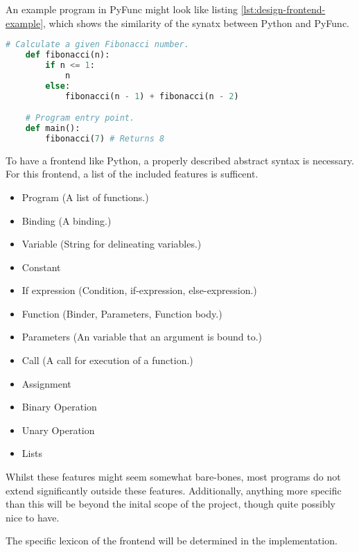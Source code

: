 \documentclass{l4proj}
\begin{document}
An example program in PyFunc might look like listing \ref{lst:design-frontend-example}, which shows the similarity of the synatx between Python and PyFunc.
\begin{lstlisting}[language=python, caption={The simple recursive function to calculate a given fibonacci number.}, label=lst:design-frontend-example]
    # Calculate a given Fibonacci number.
    def fibonacci(n):
        if n <= 1:
            n
        else:
            fibonacci(n - 1) + fibonacci(n - 2)

    # Program entry point.
    def main():
        fibonacci(7) # Returns 8
\end{lstlisting}

To have a frontend like Python, a properly described abstract syntax is necessary.
For this frontend, a list of the included features is sufficent.
\begin{itemize}
    \item Program (A list of functions.)
    \item Binding (A binding.)
    \item Variable (String for delineating variables.)
    \item Constant
    \item If expression (Condition, if-expression, else-expression.)
    \item Function (Binder, Parameters, Function body.)
    \item Parameters (An variable that an argument is bound to.)
    \item Call (A call for execution of a function.)
    \item Assignment
    \item Binary Operation
    \item Unary Operation
    \item Lists
\end{itemize}

Whilst these features might seem somewhat bare-bones, most programs do not extend significantly outside these features.
Additionally, anything more specific than this will be beyond the inital scope of the project, though quite possibly nice to have.

The specific lexicon of the frontend will be determined in the implementation.

\end{document}
